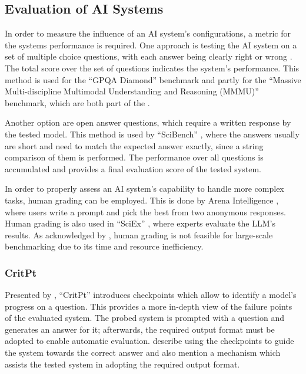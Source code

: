 \documentclass[
	fontsize = 11pt,
	paper = a4,
	draft = false,
	twoside = true,
	titlepage = false
]{scrartcl}
\numberwithin{equation}{subsection}
\begin{document}
	\subsection{Evaluation of \gls{AI} Systems} \label{sub:eval}
	In order to measure the influence of an \gls{AI} system's configurations, a metric for the systems performance is required. One approach is testing the \gls{AI} system on a set of multiple choice questions, with each answer being clearly right or wrong \autocite{mmlu}. The total score over the set of questions indicates the system's performance. This method is used for the \enquote{GPQA Diamond} benchmark \autocite{gpqaDiamondPaper} and partly for the \enquote{Massive Multi-discipline Multimodal Understanding and Reasoning (MMMU)} \autocite{MMMU} benchmark, which are both part of the \citeauthor{artAnaLeaderboard}  \autocite{artAnaLeaderboard}.
	
	Another option are open answer questions, which require a written response by the tested model. This method is used by \enquote{SciBench} \autocite{scibench}, where the answers usually are short and need to match the expected answer exactly, since a string comparison of them is performed. The performance over all questions is accumulated and provides a final evaluation score of the tested system. \autocite{scibench}
	
	In order to properly assess an \gls{AI} system's capability to handle more complex tasks, human grading can be employed. This is done by Arena Intelligence \autocite{arena}, where users write a prompt and pick the best from two anonymous responses. Human grading is also used in \enquote{SciEx} \autocite{humanGrading}, where experts evaluate the \gls{LLM}'s results. As acknowledged by \citeauthor{humanGrading} \autocite{humanGrading}, human grading is not feasible for large-scale benchmarking due to its time and resource inefficiency.
	
	\subsubsection{CritPt} \label{subsub:critPt}
	Presented by \citeauthor{critPtArx}, \enquote{CritPt} \autocite{critPtArx} introduces checkpoints which allow to identify a model’s progress on a question. This provides a more in‑depth view of the failure points of the evaluated system. The probed system is prompted with a question and generates an answer for it; afterwards, the required output format must be adopted to enable automatic evaluation. \citeauthor{critPtArx} describe using the checkpoints to guide the system towards the correct answer and also mention a mechanism which assists the tested system in adopting the required output format. \autocite{critPtArx}
	
\end{document}
